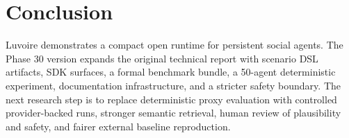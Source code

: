 \section{Conclusion}

Luvoire demonstrates a compact open runtime for persistent social agents. The Phase 30 version expands the original technical report with scenario DSL artifacts, SDK surfaces, a formal benchmark bundle, a 50-agent deterministic experiment, documentation infrastructure, and a stricter safety boundary. The next research step is to replace deterministic proxy evaluation with controlled provider-backed runs, stronger semantic retrieval, human review of plausibility and safety, and fairer external baseline reproduction.
